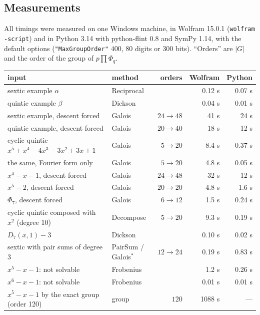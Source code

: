 \documentclass[11pt,a4paper]{article}
\theoremstyle{definition}
\theoremstyle{remark}
\newcommand{\code}[1]{\texttt{#1}}
\begin{document}
\subsection{Measurements}\label{sec:measurements}

All timings were measured on one Windows machine, in Wolfram 15.0.1 (\code{wolfram -script})
and in Python 3.14 with python-flint 0.8 and SymPy 1.14, with the default options
(\code{"MaxGroupOrder"} $400$, 80 digits or 300 bits).  ``Orders'' are $|G|$ and the
order of the group of $p\prod\Phi_q$.

\begin{center}
\small
\begin{tabular}{@{}llrrr@{}}
\toprule
input & method & orders & Wolfram & Python\\
\midrule
sextic example $\alpha$ & Reciprocal & & 0.12 s & 0.07 s\\
quintic example $\beta$ & Dickson & & 0.04 s & 0.01 s\\
sextic example, descent forced & Galois & $24\to48$ & 41 s & 24 s\\
quintic example, descent forced & Galois & $20\to40$ & 18 s & 12 s\\
cyclic quintic $x^5+x^4-4x^3-3x^2+3x+1$ & Galois & $5\to20$ & 8.4 s & 0.37 s\\
\quad the same, Fourier form only & Galois & $5\to20$ & 4.8 s & 0.05 s\\
$x^4-x-1$, descent forced & Galois & $24\to48$ & 32 s & 12 s\\
$x^5-2$, descent forced & Galois & $20\to20$ & 4.8 s & 1.6 s\\
$\Phi_7$, descent forced & Galois & $6\to12$ & 1.5 s & 0.24 s\\
cyclic quintic composed with $x^2$ (degree 10) & Decompose & $5\to20$ & 9.3 s & 0.19 s\\
$D_7(x,1)-3$ & Dickson & & 0.10 s & 0.02 s\\
sextic with pair sums of degree 3 & PairSum / Galois$^*$ & $12\to24$ & 0.19 s & 0.83 s\\
$x^5-x-1$: not solvable & Frobenius & & 1.2 s & 0.26 s\\
$x^6-x-1$: not solvable & Frobenius & & 0.01 s & 0.01 s\\
$x^5-x-1$ by the exact group (order 120) & group & $120$ & 1088 s & ---\\
\bottomrule
\end{tabular}
\end{center}
\end{document}
